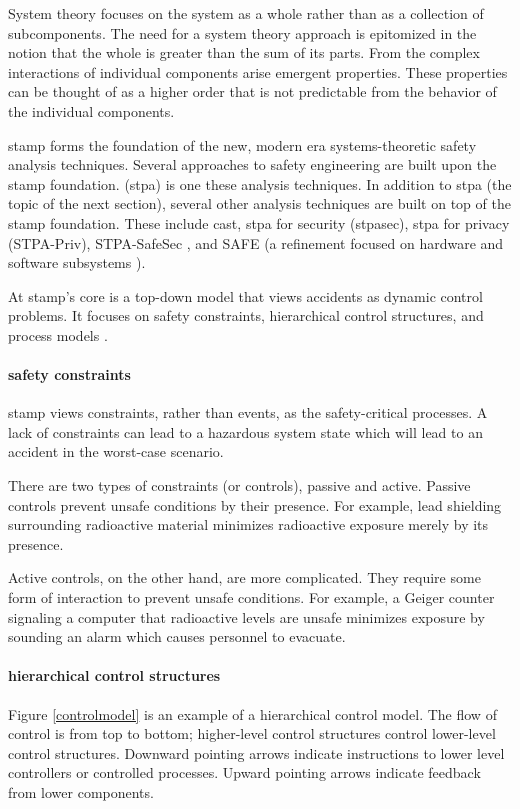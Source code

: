 \documentclass[../../main/main.tex]{subfiles}
\begin{document}
System theory focuses on the system as a whole rather than as a collection of subcomponents.  The need for a system theory approach is epitomized in the notion that the whole is greater than the sum of its parts.  From the complex interactions of individual components arise emergent properties. These properties can be thought of as a higher order that is not predictable from the behavior of the individual components.

\gls{stamp} forms the foundation of the new, modern era systems-theoretic safety analysis techniques.  Several approaches to safety engineering are built upon the \gls{stamp} foundation.   (\gls{stpa}) is one these analysis techniques.  In addition to \gls{stpa} (the topic of the next section), several other analysis techniques are built on top of the \gls{stamp} foundation.  These include \gls{cast}, \gls{stpa} for security (\gls{stpasec}), \gls{stpa} for privacy (STPA-Priv), STPA-SafeSec \cite{safe}, and SAFE (a refinement focused on hardware and software subsystems \cite{safe}).

 At \gls{stamp}'s core is a top-down model that views accidents as dynamic control problems.  It focuses on safety constraints, hierarchical control structures, and process models \cite{saferworld}. 

\paragraph*{safety constraints}
\gls{stamp} views constraints, rather than events, as the safety-critical processes.  A lack of constraints can lead to a hazardous system state which will lead to an accident in the worst-case scenario.  

There are two types of constraints (or controls), passive and active.  Passive controls prevent unsafe conditions by their presence.  For example, lead shielding surrounding radioactive material minimizes radioactive exposure merely by its presence.  

Active controls, on the other hand, are more complicated.  They require some form of interaction to prevent unsafe conditions.  For example, a Geiger counter signaling a computer that radioactive levels are unsafe minimizes exposure by sounding an alarm which causes personnel to evacuate.  

\paragraph*{hierarchical control structures}
Figure \ref{controlmodel} is an example of a hierarchical control model.  The flow of control is from top to bottom; higher-level control structures control lower-level control structures. Downward pointing arrows indicate instructions to lower level controllers or controlled processes.  Upward pointing arrows indicate feedback from lower components.   
\end{document}
